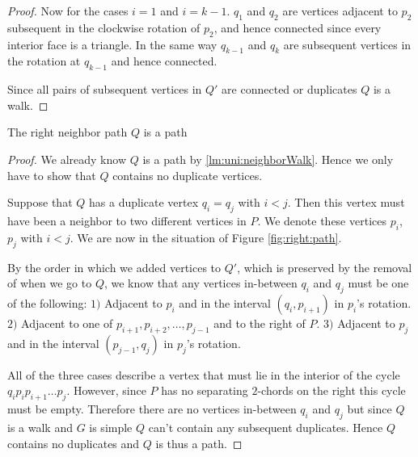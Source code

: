 \begin{proof}
    Now for the cases $i=1$ and $i=k-1$. $q_1$ and $q_2$ are vertices adjacent to $p_{2}$ subsequent in the clockwise rotation of ${p_2}$, and hence connected since every interior face is a triangle. In the same way $q_{k-1}$ and $q_k$ are subsequent vertices in the rotation at $q_{k-1}$ and hence connected.

    Since all pairs of subsequent vertices in $Q'$ are connected or duplicates $Q$ is a walk.
  \end{proof}

  \begin{lemma}
    \label{lm:uni:neighborPath}
    The right neighbor path $Q$ is a path
  \end{lemma}
  \begin{proof}
    We already know $Q$ is a path by \ref{lm:uni:neighborWalk}. Hence we only have to show that $Q$ contains no duplicate vertices.

    Suppose that $Q$ has a duplicate vertex $q_i=q_j$ with $i<j$. Then this vertex must have been a neighbor to two different vertices in $P$. We denote these vertices $p_i$, $p_j$ with $i<j$. We are now in the situation of Figure \ref{fig:right:path}.

    By the order in which we added vertices to $Q'$, which is preserved by the removal of when we go to $Q$, we know that any vertices in-between $q_i$ and $q_j$ must be one of the following: $1)$ Adjacent to $p_i$ and in the interval $(q_i, p_{i+1})$ in $p_i$'s rotation. $2)$ Adjacent to one of $p_{i+1},  p_{i+2},\ldots, p_{j-1}$ and to the right of $P$. $3)$ Adjacent to $p_j$ and in the interval $(p_{j-1}, q_j)$ in $p_j$'s rotation.

    All of the three cases describe a vertex that must lie in the interior of the cycle $q_i p_i p_{i+1} \ldots p_j$. However, since $P$ has no separating $2$-chords on the right this cycle must be empty. Therefore there are no vertices in-between $q_i$ and $q_j$ but since $Q$ is a walk and $G$ is simple $Q$ can't contain any subsequent duplicates. Hence $Q$ contains no duplicates and $Q$ is thus a path.
  \end{proof}

